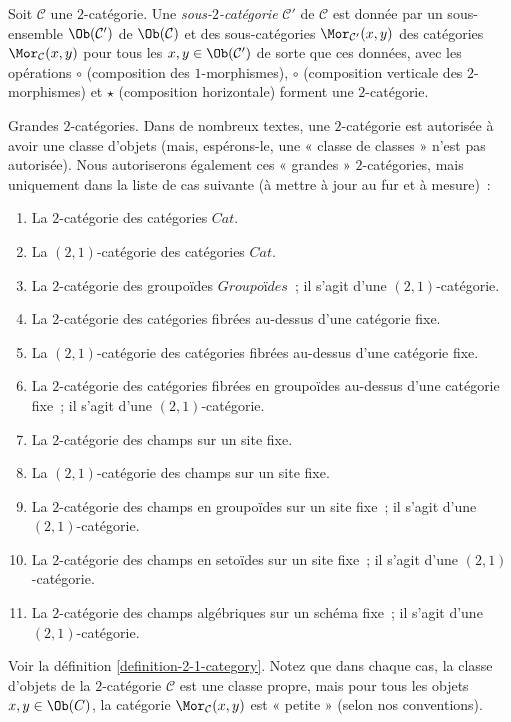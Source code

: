 \begin{definition}
\label{definition-sub-2-category}
Soit $\mathcal{C}$ une $2$-catégorie. Une {\it sous-$2$-catégorie}
$\mathcal{C}'$ de $\mathcal{C}$ est donnée par un sous-ensemble
$\Ob(\mathcal{C}')$ de $\Ob(\mathcal{C})$ et des sous-catégories
$\Mor_{\mathcal{C}'}(x, y)$ des catégories $\Mor_\mathcal{C}(x, y)$ pour tous
les $x, y \in \Ob(\mathcal{C}')$ de sorte que ces données, avec les opérations
$\circ$ (composition des $1$-morphismes), $\circ$ (composition verticale des
$2$-morphismes) et $\star$ (composition horizontale) forment une
$2$-catégorie.
\end{definition}

\begin{remark}
\label{remark-big-2-categories}
Grandes $2$-catégories. Dans de nombreux textes, une $2$-catégorie est
autorisée à avoir une classe d'objets (mais, espérons-le, une « classe de
classes » n'est pas autorisée). Nous autoriserons également ces « grandes »
$2$-catégories, mais uniquement dans la liste de cas suivante (à mettre à jour
au fur et à mesure) :
\begin{enumerate}
\item La $2$-catégorie des catégories $\textit{Cat}$.
\item La $(2, 1)$-catégorie des catégories $\textit{Cat}$.
\item La $2$-catégorie des groupoïdes $\textit{Groupoïdes}$ ; il s'agit d'une
$(2, 1)$-catégorie.
\item La $2$-catégorie des catégories fibrées au-dessus d'une catégorie fixe.
\item La $(2, 1)$-catégorie des catégories fibrées au-dessus d'une catégorie fixe.
\item La $2$-catégorie des catégories fibrées en groupoïdes au-dessus d'une catégorie
fixe ; il s'agit d'une $(2, 1)$-catégorie.
\item La $2$-catégorie des champs sur un site fixe.
\item La $(2, 1)$-catégorie des champs sur un site fixe.
\item La $2$-catégorie des champs en groupoïdes sur un site fixe ; il s'agit
d'une $(2, 1)$-catégorie.
\item La $2$-catégorie des champs en setoïdes sur un site fixe ; il s'agit d'une
$(2, 1)$-catégorie.
\item La $2$-catégorie des champs algébriques sur un schéma fixe ; il s'agit
d'une $(2, 1)$-catégorie.
\end{enumerate}
Voir la définition \ref{definition-2-1-category}. Notez que dans chaque cas,
la classe d'objets de la $2$-catégorie $\mathcal{C}$ est une classe propre,
mais pour tous les objets $x, y \in \Ob(C)$, la catégorie $\Mor_\mathcal{C}(x, y)$ est « petite » (selon nos conventions).
\end{remark}

